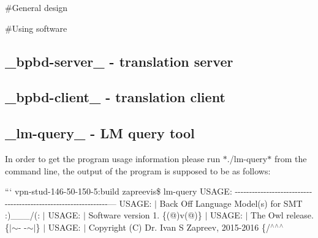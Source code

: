 \#\+General design

\#\+Using software

\subsection*{\+\_\+bpbd-\/server\+\_\+ -\/ translation server}

\subsection*{\+\_\+bpbd-\/client\+\_\+ -\/ translation client}

\subsection*{\+\_\+lm-\/query\+\_\+ -\/ L\+M query tool}

In order to get the program usage information please run $\ast$./lm-\/query$\ast$ from the command line, the output of the program is supposed to be as follows\+:

``` vpn-\/stud-\/146-\/50-\/150-\/5\+:build zapreevis\$ lm-\/query U\+S\+A\+G\+E\+: -\/-\/-\/-\/-\/-\/-\/-\/-\/-\/-\/-\/-\/-\/-\/-\/-\/-\/-\/-\/-\/-\/-\/-\/-\/-\/-\/-\/-\/-\/-\/-\/-\/-\/-\/-\/-\/-\/-\/-\/-\/-\/-\/-\/-\/-\/-\/-\/-\/-\/-\/-\/-\/-\/-\/-\/-\/-\/-\/-\/-\/-\/-\/--- U\+S\+A\+G\+E\+: $\vert$ Back Off Language Model(s) for S\+M\+T \+:)\+\_\+\+\_\+\+\_\+/(\+: $\vert$ U\+S\+A\+G\+E\+: $\vert$ Software version 1. \{(@)v(@)\} $\vert$ U\+S\+A\+G\+E\+: $\vert$ The Owl release. \{$\vert$$\sim$-\/ -\/$\sim$$\vert$\} $\vert$ U\+S\+A\+G\+E\+: $\vert$ Copyright (C) Dr. Ivan S Zapreev, 2015-\/2016 \{/$^\wedge$\textquotesingle{}$^\wedge$\textquotesingle{}$^\wedge$ 
